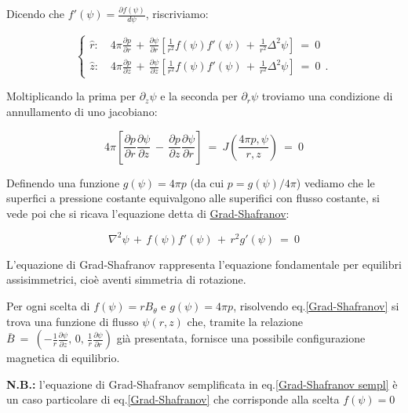 Dicendo che $f'(\psi)=\frac{\partial f(\psi)}{d\psi}$, riscriviamo:

\[\begin{cases}
	\hat r:\quad 4\pi \frac{\partial p}{\partial r}\, +\, \frac{\partial \psi}{\partial r}\left[ \frac{1}{r^2} f(\psi) f'(\psi) \, +\, \frac{1}{r^2} \Delta^2 \psi\right]\ =\ 0\\
	\hat z:\quad 4\pi \frac{\partial p}{\partial z}\, +\, \frac{\partial \psi}{\partial z}\left[ \frac{1}{r^2} f(\psi) f'(\psi) \, +\, \frac{1}{r^2} \Delta^2 \psi\right]\ =\ 0\ \ .
\end{cases}\]

Moltiplicando la prima per $\partial_z \psi$ e la seconda per $\partial_r \psi$ troviamo una condizione di annullamento di uno jacobiano:

\[
4\pi \left[\frac{\partial p}{\partial r}\frac{\partial \psi}{\partial z}\, -\,\frac{\partial p}{\partial z}\frac{\partial \psi}{\partial r} \right]
\ =\ J \left(\frac{4\pi p,\psi}{r,z} \right)\ =\ 0
\]

Definendo una funzione $\boxed{g(\psi)=4\pi p}$ (da cui $p=g(\psi)/4\pi$) vediamo che le superfici a pressione costante equivalgono alle superifici con flusso costante, si vede poi che si ricava l'equazione detta di \underline{Grad-Shafranov}:

\begin{equation}
	\label{Grad-Shafranov}
	\boxed{\ \nabla^2 \psi\, +\, f(\psi)f'(\psi)\, +\, r^2 g'(\psi)\ =\ 0\ }
\end{equation}

L'equazione di Grad-Shafranov rappresenta l'equazione fondamentale per equilibri assisimmetrici, cioè aventi simmetria di rotazione.

Per ogni scelta di $f(\psi)=rB_\theta$ e $g(\psi)=4\pi p$, risolvendo eq.\ref{Grad-Shafranov} si trova una funzione di flusso $\psi(r,z)$ che, tramite la relazione $\bar B\ =\ \left(-\frac{1}{r} \frac{\partial \psi}{\partial z},\, 0,\, \frac{1}{r}\frac{\partial \psi}{\partial r}\right)$ già presentata, fornisce una possibile configurazione magnetica di equilibrio.

\vspace{0.5cm}

\textbf{N.B.:} l'equazione di Grad-Shafranov semplificata in eq.\ref{Grad-Shafranov sempl} è un caso particolare di eq.\ref{Grad-Shafranov} che corrisponde alla scelta $f(\psi)=0$